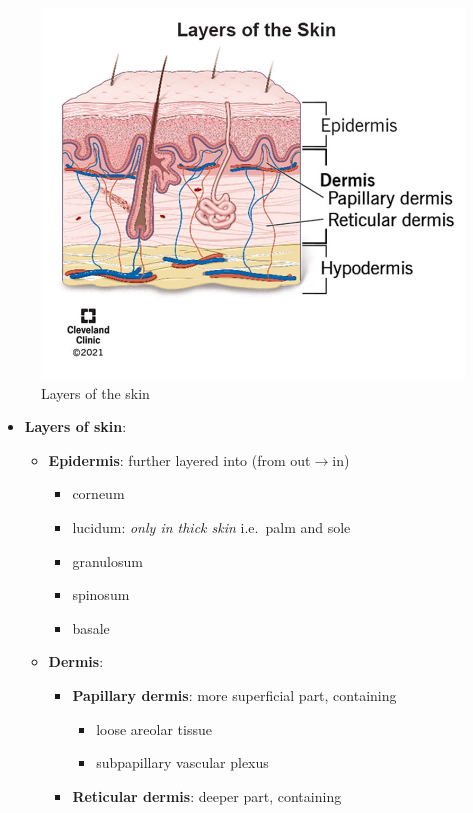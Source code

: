 \documentclass[
  12pt,
]{memoir}
\providecommand{\tightlist}{%
  \setlength{\itemsep}{0pt}\setlength{\parskip}{0pt}}
\begin{document}
\begin{figure}
    \centering
    \includegraphics[width=.5\textwidth]{../assets/surg/skin-layers.jpg}
    \caption{Layers of the skin}
\end{figure}

\begin{itemize}
\tightlist
\item
  \textbf{Layers of skin}:

  \begin{itemize}
  \tightlist
  \item
    \textbf{Epidermis}: further layered into (from out\(\rightarrow\)in)

    \begin{itemize}
    \tightlist
    \item
      corneum
    \item
      lucidum: \emph{only in thick skin} i.e.~palm and sole
    \item
      granulosum
    \item
      spinosum
    \item
      basale
    \end{itemize}
  \item
    \textbf{Dermis}:

    \begin{itemize}
    \tightlist
    \item
      \textbf{Papillary dermis}: more superficial part, containing

      \begin{itemize}
      \tightlist
      \item
        loose areolar tissue
      \item
        subpapillary vascular plexus
      \end{itemize}
    \item
      \textbf{Reticular dermis}: deeper part, containing


\end{itemize}
\end{itemize}
\end{itemize}
\end{document}
